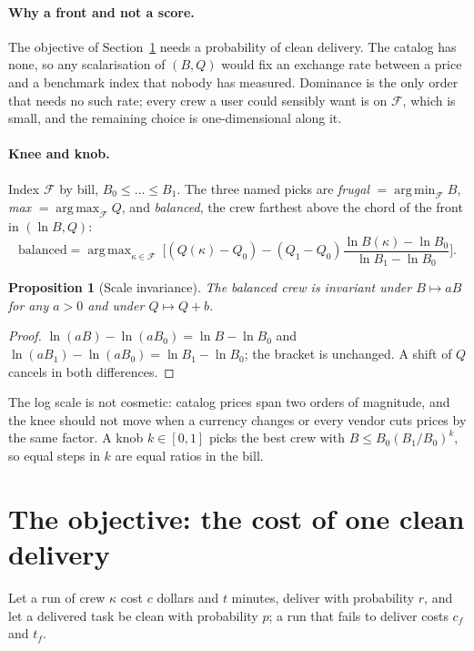 \documentclass[10pt,a4paper]{article}
\newcommand{\front}{\mathcal{F}}
\DeclareMathOperator*{\argmin}{arg\,min}
\DeclareMathOperator*{\argmax}{arg\,max}
\newtheorem{proposition}{Proposition}
\theoremstyle{definition}
\theoremstyle{remark}
\begin{document}
\paragraph{Why a front and not a score.}
The objective of Section~\ref{sec:objective} needs a probability of clean delivery. The catalog has none, so any scalarisation of $(B,Q)$ would fix an exchange rate between a price and a benchmark index that nobody has measured. Dominance is the only order that needs no such rate; every crew a user could sensibly want is on $\front$, which is small, and the remaining choice is one-dimensional along it.

\paragraph{Knee and knob.}
Index $\front$ by bill, $B_0\le\dots\le B_1$. The three named picks are \emph{frugal} $=\argmin_\front B$, \emph{max} $=\argmax_\front Q$, and \emph{balanced}, the crew farthest above the chord of the front in $(\ln B,Q)$:
\begin{equation}
\text{balanced}=\argmax_{\kappa\in\front}\ \Big[(Q(\kappa)-Q_0) - (Q_1-Q_0)\frac{\ln B(\kappa)-\ln B_0}{\ln B_1-\ln B_0}\Big].
\label{eq:knee}
\end{equation}
\begin{proposition}[Scale invariance]
The balanced crew is invariant under $B\mapsto aB$ for any $a>0$ and under $Q\mapsto Q+b$.
\end{proposition}
\begin{proof}
$\ln(aB)-\ln(aB_0)=\ln B-\ln B_0$ and $\ln(aB_1)-\ln(aB_0)=\ln B_1-\ln B_0$; the bracket is unchanged. A shift of $Q$ cancels in both differences.
\end{proof}
The log scale is not cosmetic: catalog prices span two orders of magnitude, and the knee should not move when a currency changes or every vendor cuts prices by the same factor. A knob $k\in[0,1]$ picks the best crew with $B\le B_0(B_1/B_0)^k$, so equal steps in $k$ are equal ratios in the bill.

\section{The objective: the cost of one clean delivery}
\label{sec:objective}

Let a run of crew $\kappa$ cost $c$ dollars and $t$ minutes, deliver with probability $r$, and let a delivered task be clean with probability $p$; a run that fails to deliver costs $c_f$ and $t_f$.
\end{document}
